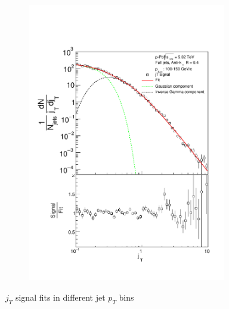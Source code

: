\begin{figure}
\begin{subfigure}{0.24\textwidth}
\includegraphics[width=0.95\textwidth]{results/JetConejTSignalFit/JetConejTSignalFitNFin00JetPt07perconeBgBayes}
\end{subfigure}
\caption{$j_T$ signal fits in different jet $p_T$ bins}
\label{fig:fits}
\end{figure}




